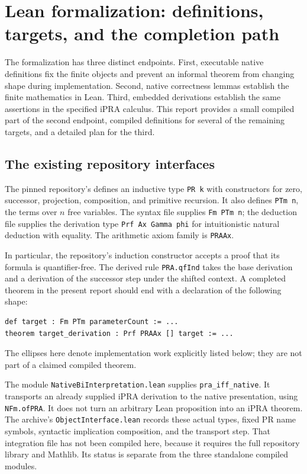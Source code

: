 \section{Lean formalization: definitions, targets, and the completion path}
\label{sec:lean-plan}

The formalization has three distinct endpoints. First, executable native
definitions fix the finite objects and prevent an informal theorem from
changing shape during implementation. Second, native correctness lemmas
establish the finite mathematics in Lean. Third, embedded derivations
establish the same assertions in the specified iPRA calculus. This report
provides a small compiled part of the second endpoint, compiled definitions
for several of the remaining targets, and a detailed plan for the third.

\subsection{The existing repository interfaces}

The pinned repository's
 defines an inductive type
\texttt{PR k} with constructors for zero, successor, projection,
composition, and primitive recursion. It also defines \texttt{PTm n},
the terms over $n$ free variables. The syntax file supplies
\texttt{Fm PTm n}; the deduction file supplies the derivation type
\texttt{Prf Ax Gamma phi} for intuitionistic natural deduction with
equality. The arithmetic axiom family is \texttt{PRAAx}.

In particular, the repository's induction constructor accepts a proof
that its formula is quantifier-free. The derived rule
\texttt{PRA.qfInd} takes the base derivation and a derivation of the
successor step under the shifted context. A completed theorem in the
present report should end with a declaration of the following shape:
\begin{verbatim}
def target : Fm PTm parameterCount := ...
theorem target_derivation : Prf PRAAx [] target := ...
\end{verbatim}
The ellipses here denote implementation work explicitly listed below;
they are not part of a claimed compiled theorem.

The module \texttt{NativeBiInterpretation.lean} supplies
\texttt{pra\_iff\_native}. It transports an already supplied iPRA
derivation to the native presentation, using \texttt{NFm.ofPRA}.
It does not turn an arbitrary Lean proposition into an iPRA theorem.
The archive's \texttt{ObjectInterface.lean} records these actual types,
fixed PR name symbols, syntactic implication composition, and the
transport step. That integration file has not been compiled here,
because it requires the full repository library and Mathlib. Its status
is separate from the three standalone compiled modules.

